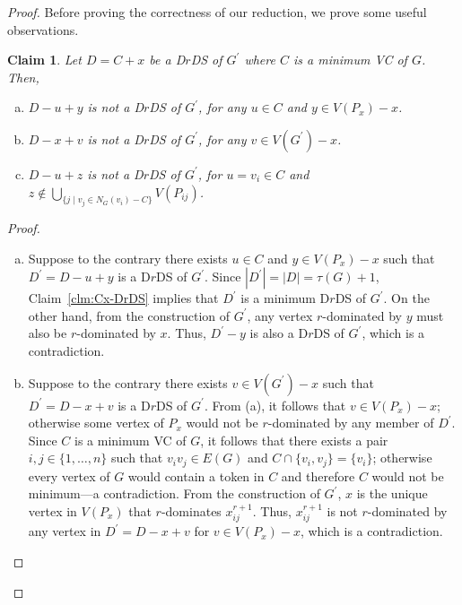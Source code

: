 \documentclass[a4paper]{article}
\theoremstyle{plain}
\newtheorem{claim}{Claim}[theorem]
\theoremstyle{definition}
\begin{document}
\begin{proof}
	Before proving the correctness of our reduction, we prove some useful observations.
	\begin{claim}\label{clm:vertex-x}
		Let $D = C + x$ be a D$r$DS of $G^\prime$ where $C$ is a minimum VC of $G$.
		Then,
		\begin{enumerate}[(a)]
			\item $D - u + y$ is not a D$r$DS of $G^\prime$, for any $u \in C$ and $y \in V(P_x) - x$.
			\item $D - x + v$ is not a D$r$DS of $G^\prime$, for any $v \in V(G^\prime) - x$.
			\item $D - u + z$ is not a D$r$DS of $G^\prime$, for $u = v_i \in C$ and $z \notin \bigcup_{\{j \mid v_j \in N_G(v_i) - C\}}V(P_{ij})$.
		\end{enumerate}
	\end{claim}
	\begin{proof}
		\begin{enumerate}[(a)]
			\item Suppose to the contrary there exists $u \in C$ and $y \in V(P_x) - x$ such that $D^\prime = D - u + y$ is a D$r$DS of $G^\prime$.
			Since $|D^\prime| = |D| = \tau(G) + 1$, Claim~\ref{clm:Cx-DrDS} implies that $D^\prime$ is a minimum D$r$DS of $G^\prime$.
			On the other hand, from the construction of $G^\prime$, any vertex $r$-dominated by $y$ must also be $r$-dominated by $x$. 
			Thus, $D^\prime - y$ is also a D$r$DS of $G^\prime$, which is a contradiction.
			
			\item Suppose to the contrary there exists $v \in V(G^\prime) - x$ such that $D^\prime = D - x + v$ is a D$r$DS of $G^\prime$.
			From (a), it follows that $v \in V(P_x) - x$; otherwise some vertex of $P_x$ would not be $r$-dominated by any member of $D^\prime$.
			Since $C$ is a minimum VC of $G$, it follows that there exists a pair $i, j \in \{1, \dots, n\}$ such that $v_iv_j \in E(G)$ and $C \cap \{v_i, v_j\} = \{v_i\}$; otherwise every vertex of $G$ would contain a token in $C$ and therefore $C$ would not be minimum---a contradiction.
			From the construction of $G^\prime$, $x$ is the unique vertex in $V(P_x)$ that $r$-dominates $x_{ij}^{r+1}$.
			Thus, $x_{ij}^{r+1}$ is not $r$-dominated by any vertex in $D^\prime = D - x + v$ for $v \in V(P_x) - x$, which is a contradiction.
			

\end{enumerate}
\end{proof}
\end{proof}
\end{document}
